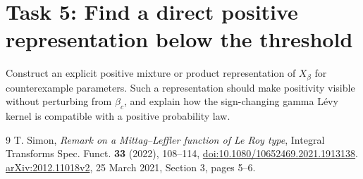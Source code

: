 \documentclass[11pt]{article}
\begin{document}
\section*{Task 5: Find a direct positive representation below the threshold}
Construct an explicit positive mixture or product representation of
$X_\beta$ for counterexample parameters. Such a representation should
make positivity visible without perturbing from $\beta_c$, and explain
how the sign-changing gamma L\'evy kernel is compatible with a positive
probability law.

\begin{thebibliography}{9}
 T. Simon,
\emph{Remark on a Mittag--Leffler function of Le Roy type},
Integral Transforms Spec. Funct. \textbf{33} (2022), 108--114,
\href{https://doi.org/10.1080/10652469.2021.1913138}{doi:10.1080/10652469.2021.1913138}.
\href{https://arxiv.org/abs/2012.11018}{arXiv:2012.11018v2},
25 March 2021, Section 3, pages 5--6.
\end{thebibliography}
\end{document}
